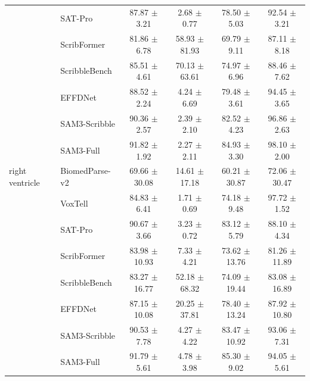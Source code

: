 \begin{table}[!p]
{\begin{tabular}{l l c c c c}
 & SAT-Pro & \cellcolor{gray!20}87.87 $\pm$ 3.21 & \cellcolor{gray!20}2.68 $\pm$ 0.77 & \cellcolor{gray!20}78.50 $\pm$ 5.03 & \cellcolor{gray!20}92.54 $\pm$ 3.21 \\
 & ScribFormer & 81.86 $\pm$ 6.78 & 58.93 $\pm$ 81.93 & 69.79 $\pm$ 9.11 & 87.11 $\pm$ 8.18 \\
 & ScribbleBench & 85.51 $\pm$ 4.61 & 70.13 $\pm$ 63.61 & 74.97 $\pm$ 6.96 & 88.46 $\pm$ 7.62 \\
 & EFFDNet & 88.52 $\pm$ 2.24 & 4.24 $\pm$ 6.69 & 79.48 $\pm$ 3.61 & 94.45 $\pm$ 3.65 \\
 & SAM3-Scribble & 90.36 $\pm$ 2.57 & 2.39 $\pm$ 2.10 & 82.52 $\pm$ 4.23 & 96.86 $\pm$ 2.63 \\
 & SAM3-Full & 91.82 $\pm$ 1.92 & 2.27 $\pm$ 2.11 & 84.93 $\pm$ 3.30 & 98.10 $\pm$ 2.00 \\
right ventricle & BiomedParse-v2 & \cellcolor{gray!20}69.66 $\pm$ 30.08 & \cellcolor{gray!20}14.61 $\pm$ 17.18 & \cellcolor{gray!20}60.21 $\pm$ 30.87 & \cellcolor{gray!20}72.06 $\pm$ 30.47 \\
 & VoxTell & \cellcolor{gray!20}84.83 $\pm$ 6.41 & \cellcolor{gray!20}1.71 $\pm$ 0.69 & \cellcolor{gray!20}74.18 $\pm$ 9.48 & \cellcolor{gray!20}97.72 $\pm$ 1.52 \\
 & SAT-Pro & \cellcolor{gray!20}90.67 $\pm$ 3.66 & \cellcolor{gray!20}3.23 $\pm$ 0.72 & \cellcolor{gray!20}83.12 $\pm$ 5.79 & \cellcolor{gray!20}88.10 $\pm$ 4.34 \\
 & ScribFormer & 83.98 $\pm$ 10.93 & 7.33 $\pm$ 4.21 & 73.62 $\pm$ 13.76 & 81.26 $\pm$ 11.89 \\
 & ScribbleBench & 83.27 $\pm$ 16.77 & 52.18 $\pm$ 68.32 & 74.09 $\pm$ 19.44 & 83.08 $\pm$ 16.89 \\
 & EFFDNet & 87.15 $\pm$ 10.08 & 20.25 $\pm$ 37.81 & 78.40 $\pm$ 13.24 & 87.92 $\pm$ 10.80 \\
 & SAM3-Scribble & 90.53 $\pm$ 7.78 & 4.27 $\pm$ 4.22 & 83.47 $\pm$ 10.92 & 93.06 $\pm$ 7.31 \\
 & SAM3-Full & 91.79 $\pm$ 5.61 & 4.78 $\pm$ 3.98 & 85.30 $\pm$ 9.02 & 94.05 $\pm$ 5.61 \\
\bottomrule
\end{tabular}%
}
\end{table}

